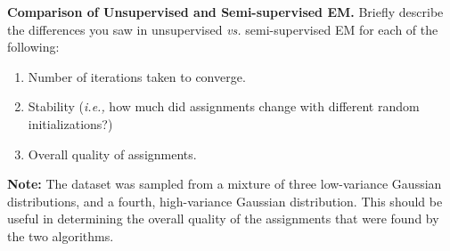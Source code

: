 \item{} \textbf{Comparison of Unsupervised and Semi-supervised EM.}
Briefly describe the differences you saw in unsupervised \emph{vs.} semi-supervised EM for each of the following:
\begin{enumerate}[label=\roman*.]
    \item Number of iterations taken to converge.
    \item Stability (\emph{i.e.,} how much did assignments change with different random initializations?)
    \item Overall quality of assignments.
\end{enumerate}

\textbf{Note:} The dataset was sampled from a mixture of three low-variance Gaussian distributions, and a fourth, high-variance Gaussian distribution. This should be useful in determining the overall quality of the assignments that were found by the two algorithms.

